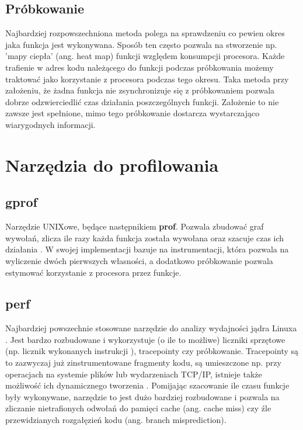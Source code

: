 \documentclass[shortabstract]{iithesis}
\theoremstyle{definition} \newtheorem*{definition}{Definicja}
\theoremstyle{definition} \newtheorem*{example}{Przykład}
\theoremstyle{definition} \newtheorem*{remark}{Uwaga}
\begin{document}
\subsection{Próbkowanie}

Najbardziej rozpowszechniona metoda polega na sprawdzeniu co pewien okres jaka funkcja jest wykonywana. Sposób ten często pozwala na stworzenie np. 'mapy ciepła' (ang. heat map) funkcji względem konsumpcji procesora. Każde trafienie w adres kodu należącego do funkcji podczas próbkowania możemy traktować jako korzystanie z procesora podczas tego okresu. Taka metoda przy założeniu, że żadna funkcja nie zsynchronizuje się z próbkowaniem pozwala dobrze odzwierciedlić czas działania poszczególnych funkcji. Założenie to nie zawsze jest spełnione, mimo tego próbkowanie dostarcza wystarczająco wiarygodnych informacji.

\section{Narzędzia do profilowania}

\subsection{gprof}

Narzędzie UNIXowe, będące następnikiem \textbf{prof}. Pozwala zbudować graf wywołań, zlicza ile razy każda funkcja została wywołana oraz szacuje czas ich działania \cite{bib:gprof}. W swojej implementacji bazuje na instrumentacji, która pozwala na wyliczenie dwóch pierwszych własności, a dodatkowo próbkowanie pozwala estymować korzystanie z procesora przez funkcje. 

\subsection{perf}

Najbardziej powszechnie stosowane narzędzie do analizy wydajności jądra Linuxa \cite{bib:perf}. Jest bardzo rozbudowane i wykorzystuje (o ile to możliwe) liczniki sprzętowe (np. licznik wykonanych instrukcji \cite{bib:perf}), tracepointy czy próbkowanie. Tracepointy są to zazwyczaj już zinstrumentowane fragmenty kodu, są umieszczone np. przy operacjach na systemie plików lub wydarzeniach TCP/IP, istnieje także możliwość ich dynamicznego tworzenia \cite{bib:perf}. Pomijając szacowanie ile czasu funkcje były wykonywane, narzędzie to jest dużo bardziej rozbudowane i pozwala na zliczanie nietrafionych odwołań do pamięci cache (ang. cache miss) czy źle przewidzianych rozgałęzień kodu (ang. branch misprediction).
\end{document}
